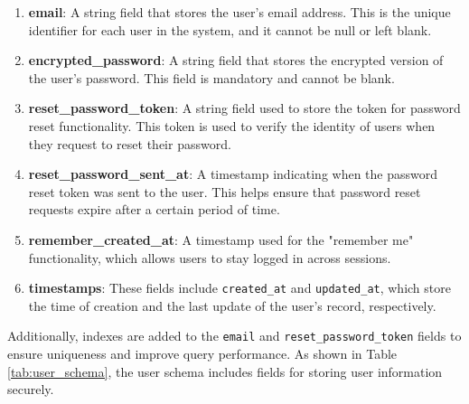 \begin{enumerate}
    \begin{enumerate}
        \item \textbf{email}: A string field that stores the user's email address. This is the unique identifier for each user in the system, and it cannot be null or left blank.
        \item \textbf{encrypted\_password}: A string field that stores the encrypted version of the user's password. This field is mandatory and cannot be blank.
        \item \textbf{reset\_password\_token}: A string field used to store the token for password reset functionality. This token is used to verify the identity of users when they request to reset their password.
        \item \textbf{reset\_password\_sent\_at}: A timestamp indicating when the password reset token was sent to the user. This helps ensure that password reset requests expire after a certain period of time.
        \item \textbf{remember\_created\_at}: A timestamp used for the "remember me" functionality, which allows users to stay logged in across sessions.
        \item \textbf{timestamps}: These fields include \texttt{created\_at} and \texttt{updated\_at}, which store the time of creation and the last update of the user's record, respectively.\\
    \end{enumerate}

    Additionally, indexes are added to the \texttt{email} and \texttt{reset\_password\_token} fields to ensure uniqueness and improve query performance.
    As shown in Table \ref{tab:user_schema}, the user schema includes fields for storing user information securely.
    

\end{enumerate}
